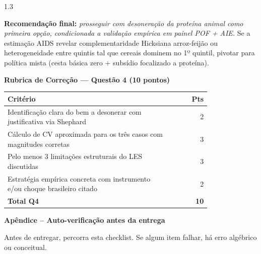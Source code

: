 \documentclass[11pt,addpoints]{exam}
\begin{document}
\begin{spacing}{1.3}
\begin{questions}
\begin{solution}
\textbf{Recomendação final:} \emph{prosseguir com desoneração da proteína animal como primeira opção, condicionada a validação empírica em painel POF + AIE.} Se a estimação AIDS revelar complementaridade Hicksiana arroz-feijão ou heterogeneidade entre quintis tal que cereais dominem no 1º quintil, pivotar para política mista (cesta básica zero $+$ subsídio focalizado a proteína).
\end{solution}

\ifprintanswers
\vspace{1em}
{\color{rubred}
\noindent\textbf{Rubrica de Correção --- Questão 4 (10 pontos)}
\vspace{0.3em}

\noindent\small
\begin{tabular}{@{}p{0.80\linewidth} r@{}}
\toprule
\textbf{Critério} & \textbf{Pts} \\
\midrule
Identificação clara do bem a desonerar com justificativa via Shephard & 2 \\
Cálculo de CV aproximada para os três casos com magnitudes corretas & 3 \\
Pelo menos 3 limitações estruturais do LES discutidas & 3 \\
Estratégia empírica concreta com instrumento e/ou choque brasileiro citado & 2 \\
\midrule
\textbf{Total Q4} & \textbf{10} \\
\bottomrule
\end{tabular}\normalsize
}
\fi

\end{questions}
\end{spacing}

\newpage
\begin{center}\large\textbf{Apêndice -- Auto-verificação antes da entrega}\end{center}
\vspace{0.5em}

\noindent Antes de entregar, percorra esta checklist. Se algum item falhar, há erro algébrico ou conceitual.
\end{document}
